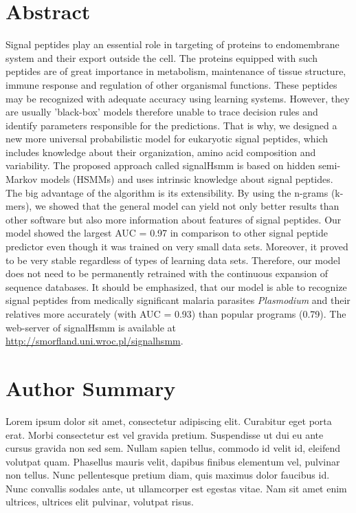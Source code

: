 \documentclass[10pt,letterpaper]{article}
\begin{document}
\section*{Abstract}
Signal peptides play an essential role in targeting of proteins to endomembrane system and their export outside the cell. The proteins equipped with such peptides are of great importance in metabolism, maintenance of tissue structure, immune response and regulation of other organismal functions. These peptides may be recognized with adequate accuracy using learning systems. However, they are usually 'black-box' models therefore unable to trace decision rules and identify parameters responsible for the predictions. That is why, we designed a new more universal probabilistic model for eukaryotic signal peptides, which includes knowledge about their organization, amino acid composition and variability. The proposed approach called signalHsmm is based on hidden semi-Markov models (HSMMs) and uses intrinsic knowledge about signal peptides. The big advantage of the algorithm is its extensibility. By using the n-grams (k-mers), we showed that the general model can yield not only better results than other software but also more information about features of signal peptides. Our model showed the largest AUC = 0.97 in comparison to other signal peptide predictor even though it was trained on very small data sets. Moreover, it proved to be very stable regardless of types of learning data sets. Therefore, our model does not need to be permanently retrained with the continuous expansion of sequence databases. It should be emphasized, that our model is able to recognize signal peptides from medically significant malaria parasites \textit{Plasmodium} and their relatives more accurately (with AUC = 0.93) than popular programs (0.79). The web-server of signalHsmm is available at \url{http://smorfland.uni.wroc.pl/signalhsmm}.


\section*{Author Summary}
Lorem ipsum dolor sit amet, consectetur adipiscing elit. Curabitur eget porta erat. Morbi consectetur est vel gravida pretium. Suspendisse ut dui eu ante cursus gravida non sed sem. Nullam sapien tellus, commodo id velit id, eleifend volutpat quam. Phasellus mauris velit, dapibus finibus elementum vel, pulvinar non tellus. Nunc pellentesque pretium diam, quis maximus dolor faucibus id. Nunc convallis sodales ante, ut ullamcorper est egestas vitae. Nam sit amet enim ultrices, ultrices elit pulvinar, volutpat risus.
\end{document}
